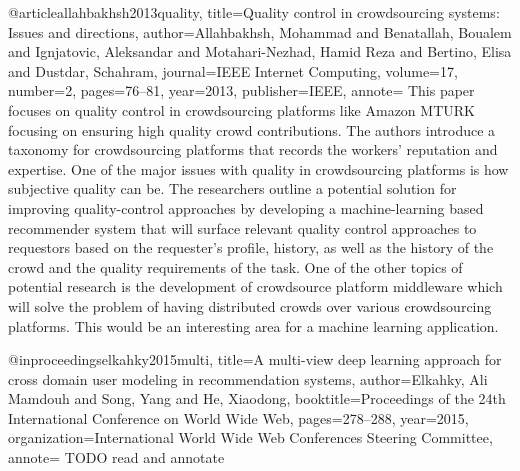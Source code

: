 @article{allahbakhsh2013quality,
  title={Quality control in crowdsourcing systems: Issues and directions},
  author={Allahbakhsh, Mohammad and Benatallah, Boualem and Ignjatovic, Aleksandar and Motahari-Nezhad, Hamid Reza and Bertino, Elisa and Dustdar, Schahram},
  journal={IEEE Internet Computing},
  volume={17},
  number={2},
  pages={76--81},
  year={2013},
  publisher={IEEE},
  annote={
  This paper focuses on quality control in crowdsourcing platforms like Amazon MTURK focusing on ensuring high quality crowd contributions. The authors introduce a taxonomy for crowdsourcing platforms
  that records the workers' reputation and expertise. One of the major issues with quality in crowdsourcing platforms is how subjective quality can be. The researchers outline a potential solution for improving
  quality-control approaches by developing a machine-learning based recommender system that will surface relevant quality control approaches to requestors based on the requester's profile, history, as well as the history
  of the crowd and the quality requirements of the task. One of the other topics of potential research is the development of crowdsource platform middleware which will solve the problem of having distributed crowds over various
  crowdsourcing platforms. This would be an interesting area for a machine learning application.
  }
}

@inproceedings{elkahky2015multi,
  title={A multi-view deep learning approach for cross domain user modeling in recommendation systems},
  author={Elkahky, Ali Mamdouh and Song, Yang and He, Xiaodong},
  booktitle={Proceedings of the 24th International Conference on World Wide Web},
  pages={278--288},
  year={2015},
  organization={International World Wide Web Conferences Steering Committee},
  annote={
  TODO read and annotate
  }
}

